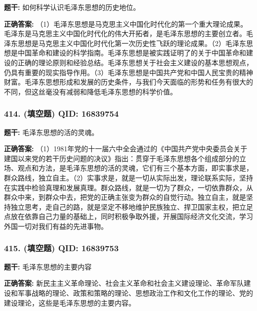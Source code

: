 \documentclass[12pt,UTF8]{ctexart}
\begin{document}
\textbf{题干:}
如何科学认识毛泽东思想的历史地位。

\textbf{正确答案:}
（1）毛泽东思想是马克思主义中国化时代化的第一个重大理论成果。毛泽东是马克思主义中国化时代化的伟大开拓者，是毛泽东思想的主要创立者。毛泽东思想是马克思主义中国化时代化第一次历史性飞跃的理论成果。（2）毛泽东思想是中国革命和建设的科学指南。毛泽东思想是被实践证明了的关于中国革命和建设的正确的理论原则和经验总结。毛泽东思想关于社会主义建设的基本思想观点，仍具有重要的现实指导作用。（3）毛泽东思想是中国共产党和中国人民宝贵的精神财富。毛泽东思想形成和发展的历史条件，与我们今天面临的形势和任务有很大的不同，但这丝毫没有减弱和降低毛泽东思想的科学价值。

\vspace{0.3em}\hrulefill\vspace{0.7em}

\subsubsection*{414. (填空题) \small QID: 16839754}

\textbf{题干:}
毛泽东思想的活的灵魂。

\textbf{正确答案:}
（1）1981年党的十一届六中全会通过的《中国共产党中央委员会关于建国以来党的若干历史问题的决议》指出：贯穿于毛泽东思想各个组成部分的立场、观点和方法，是毛泽东思想的活的灵魂，它们有三个基本方面，即实事求是，群众路线，独立自主。（2）实事求是，就是一切从实际出发，理论联系实际，坚持在实践中检验真理和发展真理。群众路线，就是一切为了群众，一切依靠群众，从群众中来，到群众中去，把党的正确主张变为群众的自觉行动。独立自主，就是坚持独立思考，走自己的路，就是坚定不移地维护民族独立、捍卫国家主权，把立足点放在依靠自己力量的基础上，同时积极争取外援，开展国际经济文化交流，学习外国一切对我们有益的先进事物。

\vspace{0.3em}\hrulefill\vspace{0.7em}

\subsubsection*{415. (填空题) \small QID: 16839753}

\textbf{题干:}
毛泽东思想的主要内容

\textbf{正确答案:}
新民主主义革命理论、社会主义革命和社会主义建设理论、革命军队建设和军事战略的理论、政策和策略的理论、思想政治工作和文化工作的理论、党的建设理论，这些是毛泽东思想的主要内容。

\vspace{0.3em}\hrulefill\vspace{0.7em}
\end{document}
